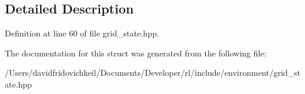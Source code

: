\subsection{Detailed Description}


Definition at line 60 of file grid\+\_\+state.\+hpp.



The documentation for this struct was generated from the following file\+:\begin{DoxyCompactItemize}
\item 
/\+Users/davidfridovichkeil/\+Documents/\+Developer/rl/include/environment/grid\+\_\+state.\+hpp\end{DoxyCompactItemize}
